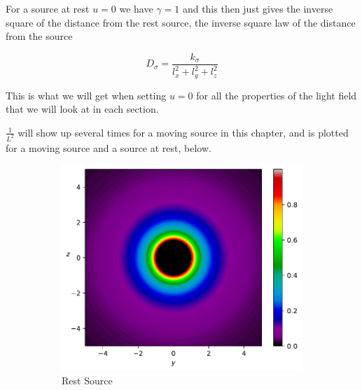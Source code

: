 For a source at rest $u=0$ we have $\gamma = 1$ and this then just gives the inverse square of the distance from the rest source, the inverse square law of the distance from the source

\begin{equation}
	D_{\sigma} = \frac{k_{\sigma}}{l^2_{x} + l^2_{y} + l^2_{z}}
\end{equation}

This is what we will get when setting $u=0$ for all the properties of the light field that we will look at in each section.

$\frac{1}{L^2}$ will show up several times for a moving source in this chapter, and is plotted for a moving source and a source at rest, below.

\begin{figure}[H]
	\centering
	\begin{subfigure}{0.45\textwidth}
		\centering
		\includegraphics[width=\textwidth]{images/pdf/Density_of_Light_from_Rest_Source.pdf}
		\caption{Rest Source}
		\label{subfig_1: light emitted from a source's rate of change of vector density}
	\end{subfigure}
	\begin{subfigure}{0.45\textwidth}
		\centering

\end{subfigure}
\end{figure}
